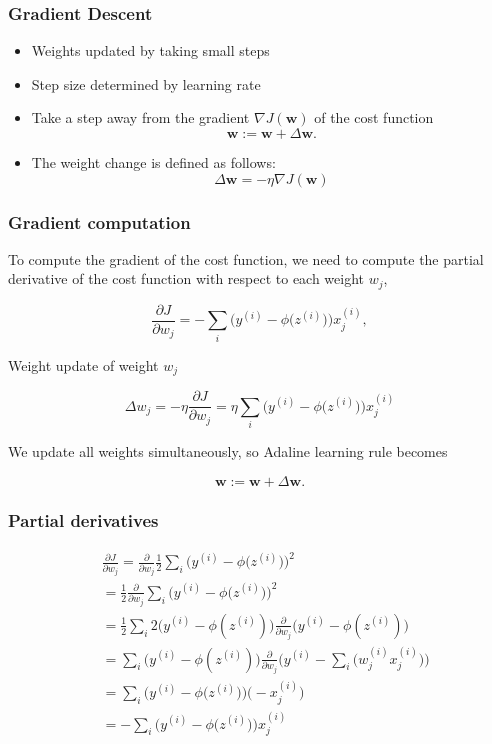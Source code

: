 \documentclass{beamer}
\begin{document}
\begin{frame}
  \frametitle{Gradient Descent}
  \begin{itemize}
  \item Weights updated by taking small steps
  \item Step size determined by learning rate
  \item Take a step away from the gradient $\nabla J(\mathbf{w})$ of the cost function
    \[
    \mathbf{w} := \mathbf{w} + \Delta \mathbf{w}.
    \]
  \item The weight change is defined as follows:
    \[
    \Delta \mathbf{w} = - \eta \nabla J(\mathbf{w})
    \]
  \end{itemize}
\end{frame}

\begin{frame}
  \frametitle{Gradient computation}
  To compute the gradient of the cost function, we need to compute the partial derivative of the cost function with respect to each weight $w_j$,

  \[
  \frac{\partial J}{\partial w_j} = - \sum_i \bigg( y^{(i)} - \phi \big(z^{(i)} \big) \bigg) x_{j}^{(i)},
  \]

  Weight update of weight $w_j$

  \[
  \Delta w_j = - \eta \frac{\partial J}{\partial w_j} = \eta  \sum_i \bigg( y^{(i)} - \phi \big(z^{(i)} \big) \bigg) x_{j}^{(i)}
  \]

  We update all weights simultaneously, so Adaline learning rule becomes

  \[
  \mathbf{w} := \mathbf{w} + \Delta \mathbf{w}.
  \]
\end{frame}

\begin{frame}
  \frametitle{Partial derivatives}
  \begin{equation*}
    \begin{split}
      & \frac{\partial J}{\partial w_j} = \frac{\partial}{\partial w_j} \frac{1}{2} \sum_i \bigg(  y^{(i)} - \phi \big( z^{(i)} \big)  \bigg)^2 \\
      & = \frac{1}{2} \frac{\partial}{\partial w_j} \sum_i \bigg(  y^{(i)} - \phi \big( z^{(i)} \big)  \bigg)^2 \\
      & = \frac{1}{2} \sum_i 2 \big( y^{(i)} - \phi(z^{(i)})\big)  \frac{\partial}{\partial w_j} \Big( y^{(i)}  - \phi({z^{(i)}}) \Big) \\
      & = \sum_i \big( y^{(i)}  - \phi (z^{(i)})   \big) \frac{\partial}{\partial w_j} \Big( y^{(i)} - \sum_i \big(w^{(i)}_{j} x^{(i)}_{j} \big) \Big) \\
      & = \sum_i \bigg(  y^{(i)} - \phi \big( z^{(i)} \big)  \bigg) \bigg( - x_{j}^{(i)} \bigg) \\
      & = - \sum_i \bigg(  y^{(i)} - \phi \big( z^{(i)} \big)  \bigg) x_{j}^{(i)}  \\
    \end{split}
  \end{equation*}
\end{frame}
\end{document}
